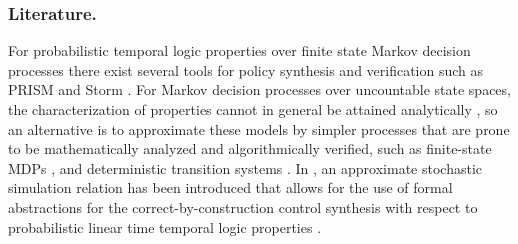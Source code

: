 \documentclass{ifacconf}
\begin{document}
\subsubsection{Literature.}For probabilistic temporal logic properties  over finite state Markov decision processes %
there exist several tools for policy synthesis and verification such as PRISM \citep{KNP11} and  Storm \citep{dehnert2017storm}. 
For Markov decision processes over uncountable state spaces,  the characterization of properties cannot in general be
attained analytically \citep{Abate1}, so an alternative is to approximate these models by simpler
processes that are prone to be mathematically analyzed and algorithmically verified,
such as finite-state MDPs \citep{soudjani2015faust}, and deterministic transition systems \citep{Zamani2014}.	
 In \citep{haesaert2017verification}, an approximate stochastic simulation relation has been introduced that allows for the use of  formal abstractions for the correct-by-construction control synthesis with respect to probabilistic linear time temporal logic properties \citep{tech_report_TACAS}. 
 
\end{document}
